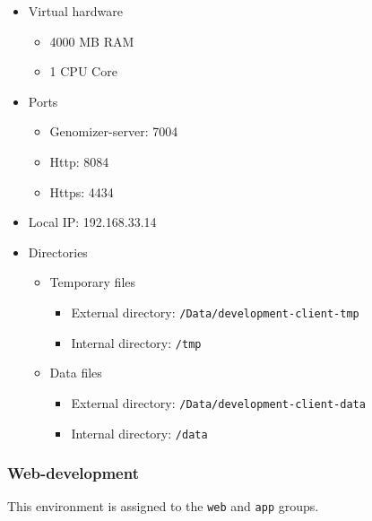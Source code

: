 \begin{itemize}
\itemsep1pt\parskip0pt
\item
  Virtual hardware

  \begin{itemize}
  \itemsep1pt\parskip0pt
  \item
    4000 MB RAM
  \item
    1 CPU Core
  \end{itemize}
\item
  Ports

  \begin{itemize}
  \itemsep1pt\parskip0pt
  \item
    Genomizer-server: 7004
  \item
    Http: 8084
  \item
    Https: 4434
  \end{itemize}
\item
  Local IP: 192.168.33.14
\item
  Directories

  \begin{itemize}
  \itemsep1pt\parskip0pt
  \item
    Temporary files

    \begin{itemize}
    \itemsep1pt\parskip0pt
    \item
      External directory: \texttt{/Data/development-client-tmp}
    \item
      Internal directory: \texttt{/tmp}
    \end{itemize}
  \item
    Data files

    \begin{itemize}
    \itemsep1pt\parskip0pt
    \item
      External directory: \texttt{/Data/development-client-data}
    \item
      Internal directory: \texttt{/data}
    \end{itemize}
  \end{itemize}
\end{itemize}

\subsubsection{Web-development}\label{sec:web-development}

This environment is assigned to the \texttt{web} and \texttt{app}
groups.

